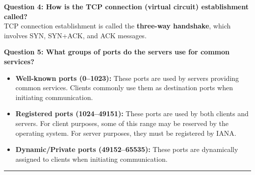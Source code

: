 \documentclass[a4paper,12pt]{article}
\begin{document}
	\textbf{Question 4: How is the TCP connection (virtual circuit) establishment called?}\\
	
	TCP connection establishment is called the \textbf{three-way handshake}, which involves SYN, SYN+ACK, and ACK messages.
	
	\textbf{Question 5: What groups of ports do the servers use for common services?}
	\begin{itemize}
		\item \textbf{Well-known ports (0–1023):} These ports are used by servers providing common services. Clients commonly use them as destination ports when initiating communication.
		\item \textbf{Registered ports (1024–49151):} These ports are used by both clients and servers. For client purposes, some of this range may be reserved by the operating system. For server purposes, they must be registered by IANA.
		\item \textbf{Dynamic/Private ports (49152–65535):} These ports are dynamically assigned to clients when initiating communication.
	\end{itemize}
	

	
	\vspace{1em}
	\hrule
	\vspace{0.5em}
	
\end{document}

